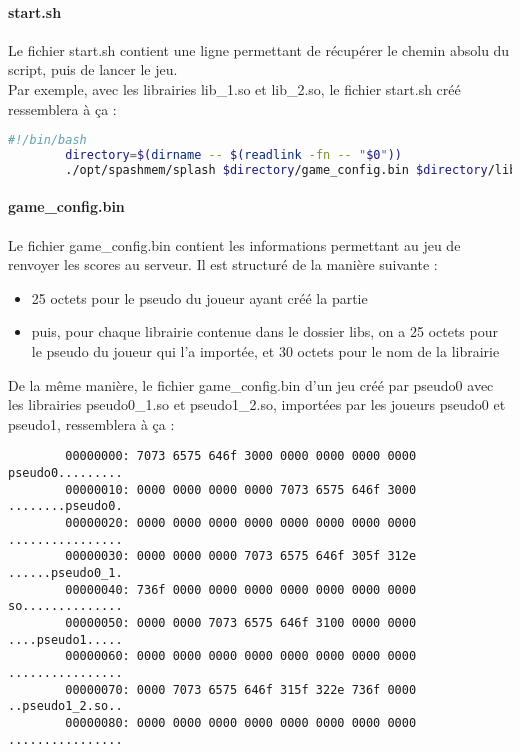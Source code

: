 \documentclass[12pt, openany]{article}
\begin{document}
	\paragraph{start.sh}
	Le fichier start.sh contient une ligne permettant de récupérer le chemin absolu du script, puis de lancer le jeu.\\
	Par exemple, avec les librairies lib\_1.so et lib\_2.so, le fichier start.sh créé ressemblera à ça :\\
	\begin{lstlisting}[language=bash]
		#!/bin/bash
		directory=$(dirname -- $(readlink -fn -- "$0"))
		./opt/spashmem/splash $directory/game_config.bin $directory/libs/lib_1.so $directory/libs/lib_2.so
	\end{lstlisting}

	\paragraph{game\_config.bin}
	Le fichier game\_config.bin contient les informations permettant au jeu de renvoyer les scores au serveur. Il est structuré de la manière suivante :\\
	\begin{itemize}[label=$-$]
		\item 25 octets pour le pseudo du joueur ayant créé la partie\\
		\item puis, pour chaque librairie contenue dans le dossier libs, on a 25 octets pour le pseudo du joueur qui l'a importée, et 30 octets pour le nom de la librairie\\
	\end{itemize}
	De la même manière, le fichier game\_config.bin d'un jeu créé par pseudo0 avec les librairies pseudo0\_1.so et pseudo1\_2.so, importées par les joueurs pseudo0 et pseudo1, ressemblera à ça :\\
	\begin{lstlisting}
		00000000: 7073 6575 646f 3000 0000 0000 0000 0000  pseudo0.........
		00000010: 0000 0000 0000 0000 7073 6575 646f 3000  ........pseudo0.
		00000020: 0000 0000 0000 0000 0000 0000 0000 0000  ................
		00000030: 0000 0000 0000 7073 6575 646f 305f 312e  ......pseudo0_1.
		00000040: 736f 0000 0000 0000 0000 0000 0000 0000  so..............
		00000050: 0000 0000 7073 6575 646f 3100 0000 0000  ....pseudo1.....
		00000060: 0000 0000 0000 0000 0000 0000 0000 0000  ................
		00000070: 0000 7073 6575 646f 315f 322e 736f 0000  ..pseudo1_2.so..
		00000080: 0000 0000 0000 0000 0000 0000 0000 0000  ................
	\end{lstlisting}
\end{document}
